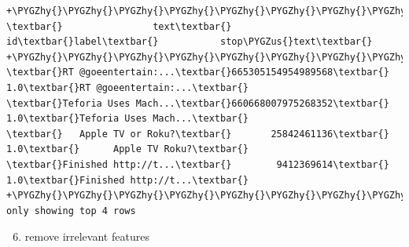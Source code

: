 \documentclass[letterpaper,11pt,english]{sphinxmanual}
\def\PYGZus{\char`\_}
\def\PYGZhy{\char`\-}
\begin{document}
\begin{Verbatim}[commandchars=\\\{\}]
+\PYGZhy{}\PYGZhy{}\PYGZhy{}\PYGZhy{}\PYGZhy{}\PYGZhy{}\PYGZhy{}\PYGZhy{}\PYGZhy{}\PYGZhy{}\PYGZhy{}\PYGZhy{}\PYGZhy{}\PYGZhy{}\PYGZhy{}\PYGZhy{}\PYGZhy{}\PYGZhy{}\PYGZhy{}\PYGZhy{}+\PYGZhy{}\PYGZhy{}\PYGZhy{}\PYGZhy{}\PYGZhy{}\PYGZhy{}\PYGZhy{}\PYGZhy{}\PYGZhy{}\PYGZhy{}\PYGZhy{}\PYGZhy{}\PYGZhy{}\PYGZhy{}\PYGZhy{}\PYGZhy{}\PYGZhy{}\PYGZhy{}+\PYGZhy{}\PYGZhy{}\PYGZhy{}\PYGZhy{}\PYGZhy{}+\PYGZhy{}\PYGZhy{}\PYGZhy{}\PYGZhy{}\PYGZhy{}\PYGZhy{}\PYGZhy{}\PYGZhy{}\PYGZhy{}\PYGZhy{}\PYGZhy{}\PYGZhy{}\PYGZhy{}\PYGZhy{}\PYGZhy{}\PYGZhy{}\PYGZhy{}\PYGZhy{}\PYGZhy{}\PYGZhy{}+
\textbar{}                text\textbar{}                id\textbar{}label\textbar{}           stop\PYGZus{}text\textbar{}
+\PYGZhy{}\PYGZhy{}\PYGZhy{}\PYGZhy{}\PYGZhy{}\PYGZhy{}\PYGZhy{}\PYGZhy{}\PYGZhy{}\PYGZhy{}\PYGZhy{}\PYGZhy{}\PYGZhy{}\PYGZhy{}\PYGZhy{}\PYGZhy{}\PYGZhy{}\PYGZhy{}\PYGZhy{}\PYGZhy{}+\PYGZhy{}\PYGZhy{}\PYGZhy{}\PYGZhy{}\PYGZhy{}\PYGZhy{}\PYGZhy{}\PYGZhy{}\PYGZhy{}\PYGZhy{}\PYGZhy{}\PYGZhy{}\PYGZhy{}\PYGZhy{}\PYGZhy{}\PYGZhy{}\PYGZhy{}\PYGZhy{}+\PYGZhy{}\PYGZhy{}\PYGZhy{}\PYGZhy{}\PYGZhy{}+\PYGZhy{}\PYGZhy{}\PYGZhy{}\PYGZhy{}\PYGZhy{}\PYGZhy{}\PYGZhy{}\PYGZhy{}\PYGZhy{}\PYGZhy{}\PYGZhy{}\PYGZhy{}\PYGZhy{}\PYGZhy{}\PYGZhy{}\PYGZhy{}\PYGZhy{}\PYGZhy{}\PYGZhy{}\PYGZhy{}+
\textbar{}RT @goeentertain:...\textbar{}665305154954989568\textbar{}  1.0\textbar{}RT @goeentertain:...\textbar{}
\textbar{}Teforia Uses Mach...\textbar{}660668007975268352\textbar{}  1.0\textbar{}Teforia Uses Mach...\textbar{}
\textbar{}   Apple TV or Roku?\textbar{}       25842461136\textbar{}  1.0\textbar{}      Apple TV Roku?\textbar{}
\textbar{}Finished http://t...\textbar{}        9412369614\textbar{}  1.0\textbar{}Finished http://t...\textbar{}
+\PYGZhy{}\PYGZhy{}\PYGZhy{}\PYGZhy{}\PYGZhy{}\PYGZhy{}\PYGZhy{}\PYGZhy{}\PYGZhy{}\PYGZhy{}\PYGZhy{}\PYGZhy{}\PYGZhy{}\PYGZhy{}\PYGZhy{}\PYGZhy{}\PYGZhy{}\PYGZhy{}\PYGZhy{}\PYGZhy{}+\PYGZhy{}\PYGZhy{}\PYGZhy{}\PYGZhy{}\PYGZhy{}\PYGZhy{}\PYGZhy{}\PYGZhy{}\PYGZhy{}\PYGZhy{}\PYGZhy{}\PYGZhy{}\PYGZhy{}\PYGZhy{}\PYGZhy{}\PYGZhy{}\PYGZhy{}\PYGZhy{}+\PYGZhy{}\PYGZhy{}\PYGZhy{}\PYGZhy{}\PYGZhy{}+\PYGZhy{}\PYGZhy{}\PYGZhy{}\PYGZhy{}\PYGZhy{}\PYGZhy{}\PYGZhy{}\PYGZhy{}\PYGZhy{}\PYGZhy{}\PYGZhy{}\PYGZhy{}\PYGZhy{}\PYGZhy{}\PYGZhy{}\PYGZhy{}\PYGZhy{}\PYGZhy{}\PYGZhy{}\PYGZhy{}+
only showing top 4 rows
\end{Verbatim}
\begin{enumerate}
\setcounter{enumi}{5}
\item {} 
remove irrelevant features

\end{enumerate}
\end{document}
